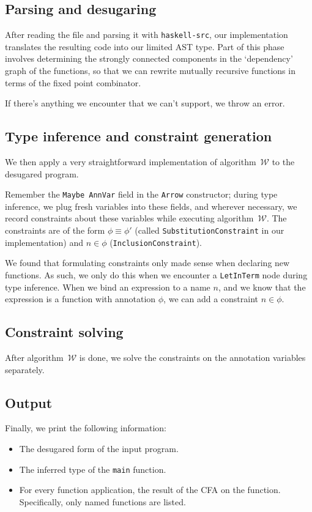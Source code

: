 \documentclass[a4paper]{scrartcl}
\newcommand{\algow}{algorithm~$\mathcal{W}$}
\begin{document}
\subsection{Parsing and desugaring}
After reading the file and parsing it with \texttt{haskell-src}, our
implementation translates the resulting code into our limited AST type.
Part of this phase involves determining the strongly connected components
in the `dependency' graph of the functions, so that we can rewrite mutually
recursive functions in terms of the fixed point combinator.

If there's anything we encounter that we can't support, we throw an error.

\subsection{Type inference and constraint generation}
We then apply a very straightforward implementation of \algow{} to the
desugared program.

Remember the \texttt{Maybe AnnVar} field in the \texttt{Arrow} constructor;
during type inference, we plug fresh variables into these fields, and wherever
necessary, we record constraints about these variables while executing \algow{}.
The constraints are of the form $\phi \equiv \phi'$ (called
\texttt{SubstitutionConstraint} in our implementation) and $n \in \phi$
(\texttt{InclusionConstraint}).

We found that formulating constraints only made sense when declaring new
functions. As such, we only do this when we encounter a \texttt{LetInTerm}
node during type inference. When we bind an expression to a name $n$,
and we know that the expression is a function with annotation $\phi$,
we can add a constraint $n \in \phi$.

\subsection{Constraint solving}
After \algow{} is done, we solve the constraints on the annotation variables
separately.

\subsection{Output}
Finally, we print the following information:
\begin{itemize}
\item The desugared form of the input program.
\item The inferred type of the \texttt{main} function.
\item For every function application, the result of the CFA on the function.
    Specifically, only named functions are listed.
\end{itemize}
\end{document}
